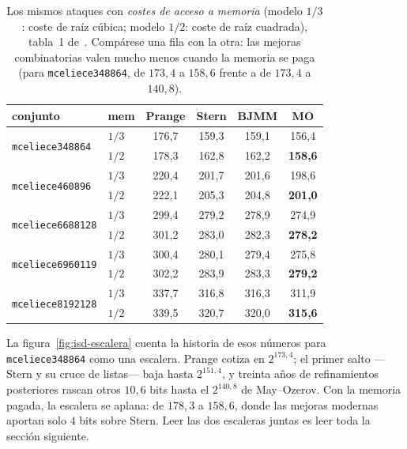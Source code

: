 \begin{table}[htbp]
\centering
\footnotesize
\setlength{\tabcolsep}{5pt}
\begin{tabular}{llcccc}
\toprule
conjunto & mem & Prange & Stern & BJMM & MO\\
\midrule
\multirow{2}{*}{\texttt{mceliece348864}} & $1/3$ & 176{,}7 & 159{,}3 & 159{,}1 & 156{,}4\\
                                        & $1/2$ & 178{,}3 & 162{,}8 & 162{,}2 & \textbf{158{,}6}\\
\multirow{2}{*}{\texttt{mceliece460896}} & $1/3$ & 220{,}4 & 201{,}7 & 201{,}6 & 198{,}6\\
                                        & $1/2$ & 222{,}1 & 205{,}3 & 204{,}8 & \textbf{201{,}0}\\
\multirow{2}{*}{\texttt{mceliece6688128}} & $1/3$ & 299{,}4 & 279{,}2 & 278{,}9 & 274{,}9\\
                                         & $1/2$ & 301{,}2 & 283{,}0 & 282{,}3 & \textbf{278{,}2}\\
\multirow{2}{*}{\texttt{mceliece6960119}} & $1/3$ & 300{,}4 & 280{,}1 & 279{,}4 & 275{,}8\\
                                         & $1/2$ & 302{,}2 & 283{,}9 & 283{,}3 & \textbf{279{,}2}\\
\multirow{2}{*}{\texttt{mceliece8192128}} & $1/3$ & 337{,}7 & 316{,}8 & 316{,}3 & 311{,}9\\
                                         & $1/2$ & 339{,}5 & 320{,}7 & 320{,}0 & \textbf{315{,}6}\\
\bottomrule
\end{tabular}
\caption{Los mismos ataques con \emph{costes de acceso a memoria}
(modelo $1/3$: coste de raíz cúbica; modelo $1/2$: coste de raíz
cuadrada), tabla~1 de~\cite{cmsecurity}. Compárese una fila con la
otra: las mejoras combinatorias valen mucho menos cuando la memoria se
paga (para \texttt{mceliece348864}, de $173{,}4$ a $158{,}6$ frente a
de $173{,}4$ a $140{,}8$).}
\label{tab:isd-mem}
\end{table}

La figura~\ref{fig:isd-escalera} cuenta la historia de esos números
para \texttt{mceliece348864} como una escalera. Prange cotiza en
$2^{173{,}4}$; el primer salto ---Stern y su cruce de listas--- baja
hasta $2^{151{,}4}$, y treinta años de refinamientos posteriores
rascan otros $10{,}6$ bits hasta el $2^{140{,}8}$ de May--Ozerov. Con
la memoria pagada, la escalera se aplana: de $178{,}3$ a $158{,}6$,
donde las mejoras modernas aportan solo $4$ bits sobre Stern. Leer
las dos escaleras juntas es leer toda la sección siguiente.

